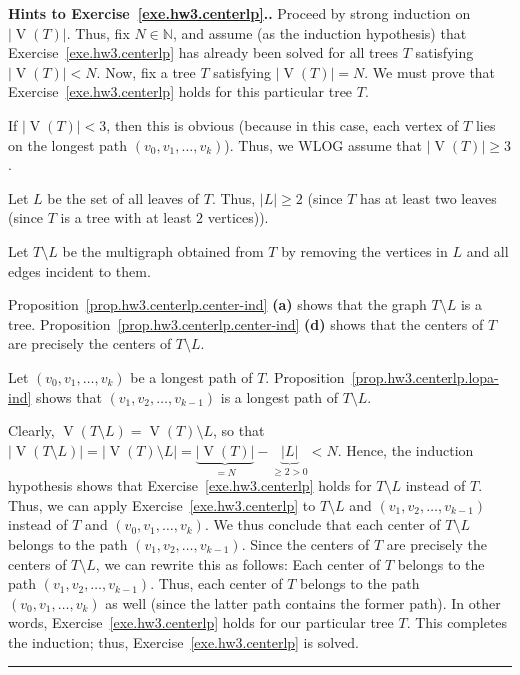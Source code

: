 \documentclass[numbers=enddot,12pt,final,onecolumn,notitlepage]{scrartcl}%
\theoremstyle{definition}
\newenvironment{proof}[1][Proof]{\noindent\textbf{#1.} }{\ \rule{0.5em}{0.5em}}
\newcommand{\NN}{\mathbb{N}}
\newcommand{\abs}[1]{\left| #1 \right|}
\newcommand{\tup}[1]{\left( #1 \right)}
\newcommand{\verts}[1]{\operatorname{V}\left( #1 \right)}
\begin{document}
\begin{proof}[Hints to Exercise~\ref{exe.hw3.centerlp}.]
Proceed by strong induction on $\abs{\verts{T}}$.
Thus, fix $N \in \NN$, and assume (as the induction hypothesis) that
Exercise~\ref{exe.hw3.centerlp} has already been solved for all
trees $T$ satisfying $\abs{\verts{T}} < N$.
Now, fix a tree $T$ satisfying $\abs{\verts{T}} = N$.
We must prove that Exercise~\ref{exe.hw3.centerlp} holds for this
particular tree $T$.

If $\abs{\verts{T}} < 3$, then this is obvious (because in this case,
each vertex of $T$ lies on the longest path
$\tup{v_0, v_1, \ldots, v_k}$).
Thus, we WLOG assume that $\abs{\verts{T}} \geq 3$.

Let $L$ be the set of all leaves of $T$. Thus, $\abs{L} \geq 2$
(since $T$ has at least two leaves (since $T$ is a tree with at least
$2$ vertices)).

Let $T \setminus L$ be the multigraph obtained from $T$ by removing
the vertices in $L$ and all edges incident to them.

Proposition~\ref{prop.hw3.centerlp.center-ind} \textbf{(a)} shows that
the graph $T \setminus L$ is a tree.
Proposition~\ref{prop.hw3.centerlp.center-ind} \textbf{(d)} shows that
the centers of $T$ are precisely the centers of $T \setminus L$.

Let $\tup{v_0, v_1, \ldots, v_k}$ be a longest path of $T$.
Proposition~\ref{prop.hw3.centerlp.lopa-ind} shows that 
$\tup{v_1, v_2, \ldots, v_{k-1}}$ is a longest path of
$T \setminus L$.

Clearly, $\verts{T \setminus L} = \verts{T} \setminus L$, so that
$\abs{\verts{T \setminus L}} = \abs{\verts{T} \setminus L}
= \underbrace{\abs{\verts{T}}}_{= N}
    - \underbrace{\abs{L}}_{\geq 2 > 0}
< N$.
Hence, the induction hypothesis shows that
Exercise~\ref{exe.hw3.centerlp} holds for $T \setminus L$ instead of
$T$.
Thus, we can apply Exercise~\ref{exe.hw3.centerlp} to
$T \setminus L$ and $\tup{v_1, v_2, \ldots, v_{k-1}}$ instead of
$T$ and $\tup{v_0, v_1, \ldots, v_k}$.
We thus conclude that each center of $T \setminus L$ belongs to the
path $\tup{v_1, v_2, \ldots, v_{k-1}}$.
Since the centers of $T$ are precisely the centers of $T \setminus L$,
we can rewrite this as follows:
Each center of $T$ belongs to the path
$\tup{v_1, v_2, \ldots, v_{k-1}}$.
Thus, each center of $T$ belongs to the path
$\tup{v_0, v_1, \ldots, v_k}$ as well (since the latter path contains
the former path).
In other words, Exercise~\ref{exe.hw3.centerlp} holds for our
particular tree $T$.
This completes the induction; thus, Exercise~\ref{exe.hw3.centerlp} is
solved.
\end{proof}
\end{document}
